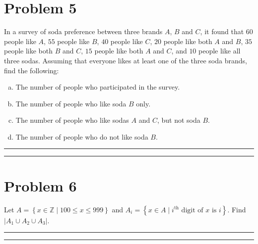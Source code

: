 \documentclass{article}
\theoremstyle{definition}
\newenvironment{solution}{\bigskip\hrule{\hfill}}{\bigskip\hrule{\hfill}} %
\begin{document}

\newpage


\section*{Problem 5}
In a survey of soda preference between three brands $A$, $B$ and $C$, it found that $60$ people like $A$, $55$ people like $B$, $40$ people like $C$, $20$ people like both $A$ and $B$, $35$ people like both $B$ and $C$, $15$ people like both $A$ and $C$, and $10$ people like all three sodas. Assuming that everyone likes at least one of the three soda brands, find the following:
\begin{enumerate}[a)] %
    \item The number of people who participated in the survey.
    \item The number of people who like soda $B$ only.
    \item The number of people who like sodas $A$ and $C$, but not soda $B$.
    \item The number of people who do not like soda $B$.
\end{enumerate}
\begin{solution}


\end{solution}


\newpage


\section*{Problem 6}
Let $A=\left\{x\in\mathbb{Z}\mid 100\leq x\leq 999\right\}$ and $A_i=\left\{x\in A\mid i^{\text{th}}\text{ digit of }x\text{ is }i\right\}$. Find $\left|A_1\cup A_2\cup A_3\right|$.
\begin{solution}


\end{solution}
\end{document}
